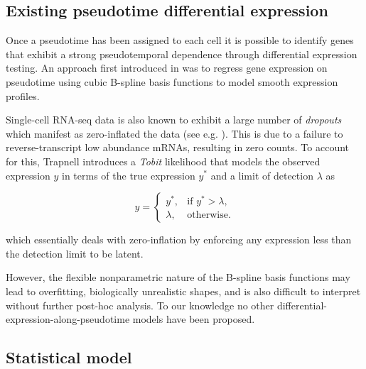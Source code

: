 \subsection{Existing pseudotime differential expression}

Once a pseudotime has been assigned to each cell it is possible to identify genes that exhibit a strong pseudotemporal dependence through differential expression testing. An approach first introduced in \cite{trapnell2014dynamics} was to regress gene expression on pseudotime using cubic B-spline basis functions to model smooth expression profiles.

Single-cell RNA-seq data is also known to exhibit a large number of \emph{dropouts} which manifest as zero-inflated the data (see e.g. \cite{kharchenko2014bayesian}). This is due to a failure to reverse-transcript low abundance mRNAs, resulting in zero counts. To account for this, Trapnell introduces a \emph{Tobit} likelihood that models the observed expression $y$ in terms of the true expression $y^*$ and a limit of detection $\lambda$ %
as

\begin{equation}
	y =
	\begin{cases}
	    y^*, & \text{if $y^* > \lambda$},  \\
	    \lambda, &  \text{otherwise}.
	\end{cases}
\end{equation}

which essentially deals with zero-inflation by enforcing any expression less than the detection limit to be latent.

However, the flexible nonparametric nature of the B-spline basis functions may lead to overfitting, biologically unrealistic shapes, and is also difficult to interpret without further post-hoc analysis. To our knowledge no other differential-expression-along-pseudotime models have been proposed.


\subsection{Statistical model}

